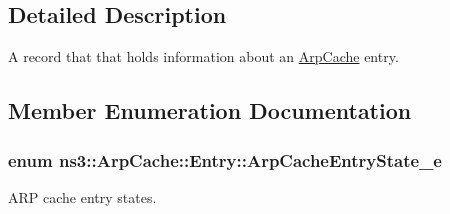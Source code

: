 \subsection{Detailed Description}
A record that that holds information about an \hyperlink{classns3_1_1ArpCache}{Arp\+Cache} entry. 

\subsection{Member Enumeration Documentation}
\subsubsection[{\texorpdfstring{Arp\+Cache\+Entry\+State\+\_\+e}{ArpCacheEntryState_e}}]{\setlength{\rightskip}{0pt plus 5cm}enum {\bf ns3\+::\+Arp\+Cache\+::\+Entry\+::\+Arp\+Cache\+Entry\+State\+\_\+e}\hspace{0.3cm}{\ttfamily [private]}}\hypertarget{classns3_1_1ArpCache_1_1Entry_a95a2d5d357f7306cf73e9efe4758a2ea}{}\label{classns3_1_1ArpCache_1_1Entry_a95a2d5d357f7306cf73e9efe4758a2ea}


A\+RP cache entry states. 

